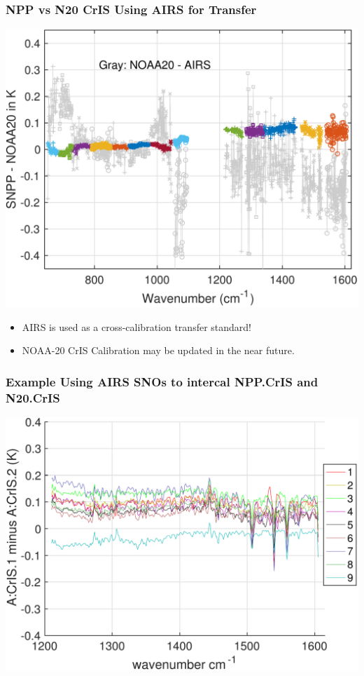 \documentclass[10pt,t]{beamer}
\begin{document}
\begin{frame}
  \frametitle{NPP vs N20 CrIS Using AIRS for Transfer}
  \begin{center}
    \includegraphics[width=0.75\linewidth]{./Figs/sno_march2018_snpp_minus_noaa20_with_c2_airs_ingrey.pdf}
  \end{center}
  \begin{itemize}
  \item AIRS is used as a cross-calibration transfer standard!
  \item NOAA-20 CrIS Calibration may be updated in the near future.
  \end{itemize}
  
\end{frame}
\begin{frame}
  \frametitle{Example Using AIRS SNOs to intercal NPP.CrIS and N20.CrIS }
  \begin{center}
    \includegraphics[width=0.95\linewidth]{./Figs/sno_ac1_ac2_dble_diff_lr_mw_cfov_2018febjun.pdf}
  \end{center}
  
\end{frame}
\end{document}
